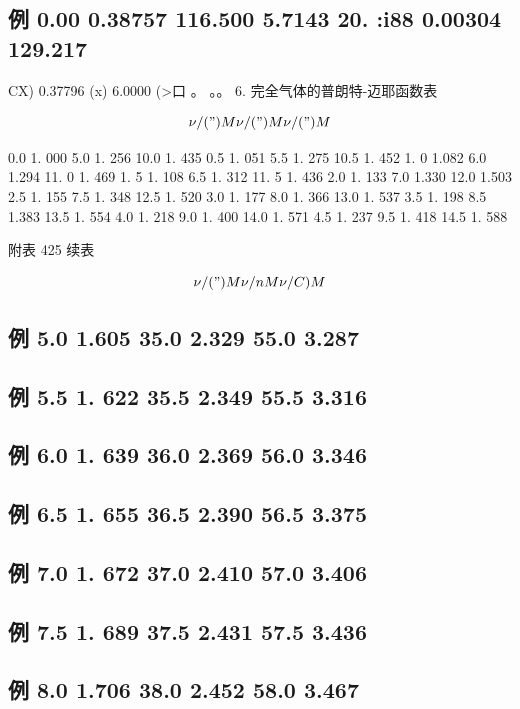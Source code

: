 \subsection*{例 0.00  0.38757 116.500 5.7143 20. :i88 0.00304 129.217}

CX) 0.37796 (x) 6.0000 (>口 。 。。 6. 完全气体的普朗特-迈耶函数表

\[\nu /(") M \nu /(") M \nu /(") M\]

0.0 1. 000 5.0 1. 256 10.0 1. 435 0.5 1. 051 5.5 1. 275 10.5 1. 452 1. 0 1.082 6.0 1.294 11. 0 1. 469 1. 5 1. 108 6.5 1. 312 11. 5 1. 436 2.0 1. 133 7.0 1.330 12.0 1.503 2.5 1. 155 7.5 1. 348 12.5 1. 520 3.0 1. 177 8.0 1. 366 13.0 1. 537 3.5 1. 198 8.5 1.383 13.5 1. 554 4.0 1. 218 9.0 1. 400 14.0 1. 571 4.5 1. 237 9.5 1. 418 14.5 1. 588

附表 425 续表

\[\nu /(") M \nu /n M \nu  /C) M\]

\subsection*{例 5.0  1.605 35.0 2.329 55.0 3.287}

\subsection*{例 5.5  1. 622 35.5 2.349 55.5 3.316}

\subsection*{例 6.0  1. 639 36.0 2.369 56.0 3.346}

\subsection*{例 6.5  1. 655 36.5 2.390 56.5 3.375}

\subsection*{例 7.0  1. 672 37.0 2.410 57.0 3.406}

\subsection*{例 7.5  1. 689 37.5 2.431 57.5 3.436}

\subsection*{例 8.0  1.706 38.0 2.452 58.0 3.467}

